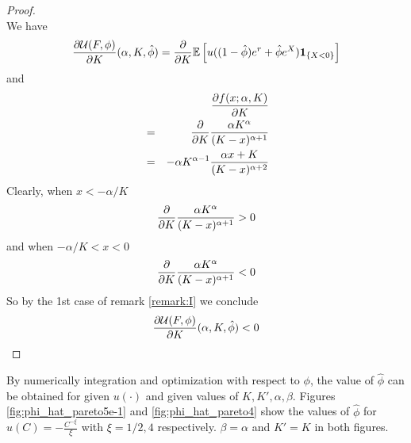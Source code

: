 \documentclass{article}
\begin{document}
\begin{proof}
\[  \]
  We have
  \[
  \frac{\partial \mathcal U(F, \phi)}{\partial K}(\alpha, K, \hat\phi)
  = \frac{\partial}{\partial K} \mathbb{E} \left[
    u((1 - \hat\phi) e^r + \hat\phi e^X) \mathbf{1}_{\{X < 0\}}
  \right] 
  \]
  and
  \begin{eqnarray*}
    && \frac{\partial f(x; \alpha, K)}{\partial K} \\
    &=& \frac{\partial}{\partial K} {\alpha K^\alpha \over (K - x)^{\alpha + 1}} \\
    &=&
    -\alpha K^{\alpha - 1} {
      \alpha x + K
      \over
      (K - x)^{\alpha + 2}
    }
  \end{eqnarray*}
  Clearly, when $x < -\alpha/K$
  \[
  \frac{\partial}{\partial K} {\alpha K^\alpha \over (K - x)^{\alpha + 1}} > 0
  \]
  and when $-\alpha/K < x < 0$
  \[
  \frac{\partial}{\partial K} {\alpha K^\alpha \over (K - x)^{\alpha + 1}} < 0
  \]
  So by the 1st case of remark \ref{remark:I} we conclude
  \[
  \frac{\partial \mathcal U(F, \phi)}{\partial K}(\alpha, K, \hat\phi) < 0  
  \]
\end{proof}
By numerically integration and optimization with respect to $\phi$,
the value of $\hat\phi$ can be obtained for given $u(\cdot)$ and given
values of $K, K', \alpha, \beta$. Figures \ref{fig:phi_hat_pareto5e-1}
and \ref{fig:phi_hat_pareto4} show the values of $\hat\phi$ for
$u(C) = -\frac{C^{-\xi}}{\xi}$ with $\xi = 1/2, 4$ respectively.
$\beta=\alpha$ and $K'=K$ in both figures.
\end{document}
